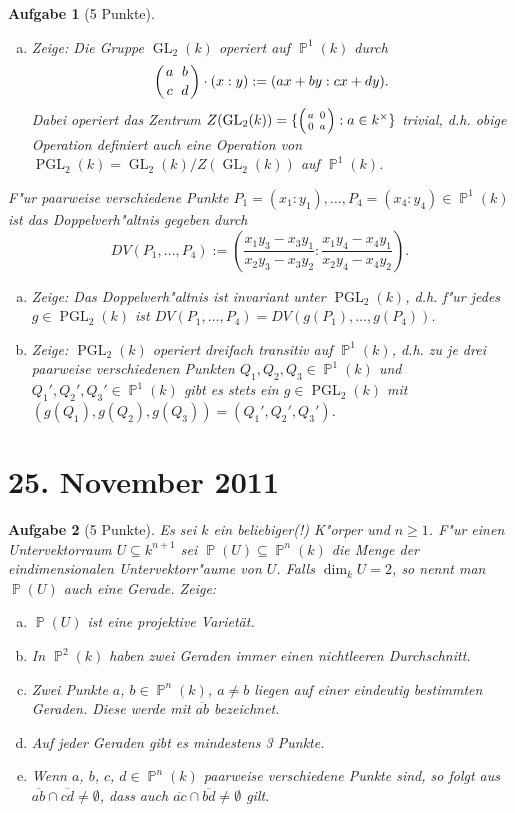 \documentclass[a4paper, 12pt, numbers=noendperiod, chapterprefix=true]{scrbook}
\theoremstyle{break}
\newtheorem{Aufg}{Aufgabe}
\theoremstyle{nonumberbreak}
\theoremstyle{nonumberplain}
\DeclareMathOperator{\GL}{GL}
\DeclareMathOperator{\PGL}{PGL} %
\newcommand{\A}{\mathbb{A}}
\DeclareMathOperator{\Projective}{\mathbb{P}} %
\begin{document}
\begin{Aufg}[5 Punkte]
\begin{enumerate}[a)]
\item \emph{Zeige}: Die Gruppe $\GL_2(k)$ operiert auf $\Projective^1(k)$ durch
	\[
		\left( {a \atop c} \ {b \atop d} \right) \cdot (x:y) := (ax+by:cx+dy) .
	\]
Dabei operiert das Zentrum $Z(\GL_2(k)) = \{ \Big( {a \atop 0} \, {0 \atop a} \Big) : a \in k^\times \}$ trivial, d.h. obige Operation definiert auch eine Operation von $\PGL_2(k) = \GL_2(k) / Z(\GL_2(k))$ auf $\Projective^1(k)$.
\end{enumerate}

F"ur paarweise verschiedene Punkte $P_1 = (x_1:y_1), \dots, P_4=(x_4:y_4) \in \Projective^1(k)$ ist das Doppelverh"altnis gegeben durch
	\[
		DV(P_1, \ldots, P_4) := \left( \frac{x_1y_3-x_3y_1}{x_2y_3-x_3y_2} : \frac{x_1y_4-x_4y_1}{x_2y_4-x_4y_2} \right).
	\]
\begin{enumerate}[a)]
	\item[b)] \emph{Zeige}: Das Doppelverh"altnis ist invariant unter $\PGL_2(k)$, d.h. f"ur jedes $g \in \PGL_2(k)$ ist $DV(P_1, \ldots, P_4) = DV(g(P_1), \ldots, g(P_4))$.
	\item[c)] \emph{Zeige}: $\PGL_2(k)$ operiert dreifach transitiv auf $\Projective^1(k)$, d.h. zu je drei paarweise verschiedenen Punkten $Q_1, Q_2, Q_3 \in \Projective^1(k)$ und $Q_1', Q_2', Q_3' \in \Projective^1(k)$ gibt es stets ein $g \in \PGL_2(k)$ mit $(g(Q_1), g(Q_2), g(Q_3)) = (Q_1', Q_2', Q_3')$.
\end{enumerate}\end{Aufg}

\newpage
\section{25. November 2011}
\setcounter{Aufg}{0}
\setcounter{Loes}{0}

\begin{Aufg}[5 Punkte]
Es sei $k$ ein beliebiger(!) K"orper und $n\geq 1$. F"ur einen Untervektorraum $U\subseteq k^{n+1}$ sei $\Projective(U)\subseteq \Projective^n(k)$ die Menge der eindimensionalen Untervektorr"aume von $U$. Falls $\dim_k U = 2$, so nennt man $\Projective(U)$ auch eine \emph{Gerade}. Zeige:
\begin{enumerate}[a)]
	\item $\Projective(U)$ ist eine projektive Variet\"at.
	\item In $\Projective^2(k)$ haben zwei Geraden immer einen nichtleeren Durchschnitt.
	\item Zwei Punkte $a$, $b\in \Projective^n(k)$, $a\neq b$ liegen auf einer eindeutig bestimmten Geraden. Diese werde mit $\overline{ab}$ bezeichnet.
	\item Auf jeder Geraden gibt es mindestens 3 Punkte.
	\item Wenn $a$, $b$, $c$, $d\in \Projective^n(k)$ paarweise verschiedene Punkte sind, so folgt aus $\overline{ab}\cap \overline{cd} \neq \emptyset$, dass auch $\overline{ac}\cap \overline{bd} \neq \emptyset$ gilt.
\end{enumerate}
\end{Aufg}
\end{document}

